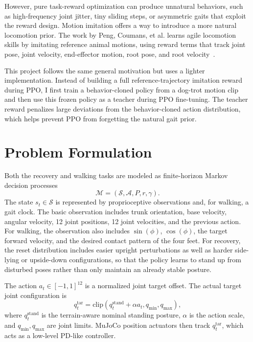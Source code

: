 \documentclass[conference]{IEEEtran}
\begin{document}
However, pure task-reward optimization can produce unnatural behaviors, such as high-frequency joint jitter, tiny sliding steps, or asymmetric gaits that exploit the reward design. Motion imitation offers a way to introduce a more natural locomotion prior. The work by Peng, Coumans, et al. learns agile locomotion skills by imitating reference animal motions, using reward terms that track joint pose, joint velocity, end-effector motion, root pose, and root velocity~\cite{peng2020learning}.

This project follows the same general motivation but uses a lighter implementation. Instead of building a full reference-trajectory imitation reward during PPO, I first train a behavior-cloned policy from a dog-trot motion clip and then use this frozen policy as a teacher during PPO fine-tuning. The teacher reward penalizes large deviations from the behavior-cloned action distribution, which helps prevent PPO from forgetting the natural gait prior.

\section{Problem Formulation}
Both the recovery and walking tasks are modeled as finite-horizon Markov decision processes
\begin{equation}
\mathcal{M}=(\mathcal{S}, \mathcal{A}, P, r, \gamma).
\end{equation}
The state $s_t \in \mathcal{S}$ is represented by proprioceptive observations and, for walking, a gait clock. The basic observation includes trunk orientation, base velocity, angular velocity, 12 joint positions, 12 joint velocities, and the previous action. For walking, the observation also includes $\sin(\phi)$, $\cos(\phi)$, the target forward velocity, and the desired contact pattern of the four feet. For recovery, the reset distribution includes easier upright perturbations as well as harder side-lying or upside-down configurations, so that the policy learns to stand up from disturbed poses rather than only maintain an already stable posture.

The action $a_t \in [-1,1]^{12}$ is a normalized joint target offset. The actual target joint configuration is
\begin{equation}
q^{\mathrm{tar}}_t =
\mathrm{clip}(q^{\mathrm{stand}}_t + \alpha a_t, q_{\min}, q_{\max}),
\end{equation}
where $q^{\mathrm{stand}}_t$ is the terrain-aware nominal standing posture, $\alpha$ is the action scale, and $q_{\min}, q_{\max}$ are joint limits. MuJoCo position actuators then track $q^{\mathrm{tar}}_t$, which acts as a low-level PD-like controller.
\end{document}
